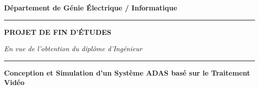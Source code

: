 
\begin{titlepage}
\begin{center}

\vspace*{0.5cm}

\begin{minipage}{0.3\textwidth}
\centering
{}
\end{minipage}
\hfill
\begin{minipage}{0.3\textwidth}
\centering
{}
\end{minipage}
\hfill
\begin{minipage}{0.3\textwidth}
\centering
{}
\end{minipage}

\vspace{1.5cm}

{\Large \textbf{Département de Génie Électrique / Informatique}}

\vspace{0.5cm}

\rule{\textwidth}{1.5pt}

\vspace{1cm}

{\Huge \textbf{PROJET DE FIN D'ÉTUDES}}

\vspace{0.5cm}

{\Large \textit{En vue de l'obtention du diplôme d'Ingénieur}}

\vspace{1cm}

\rule{0.8\textwidth}{0.5pt}

\vspace{0.5cm}

{\LARGE \textcolor{stellantisblue}{\textbf{Conception et Simulation d'un Système ADAS basé sur le Traitement Vidéo}}}


\end{center}
\end{titlepage}
